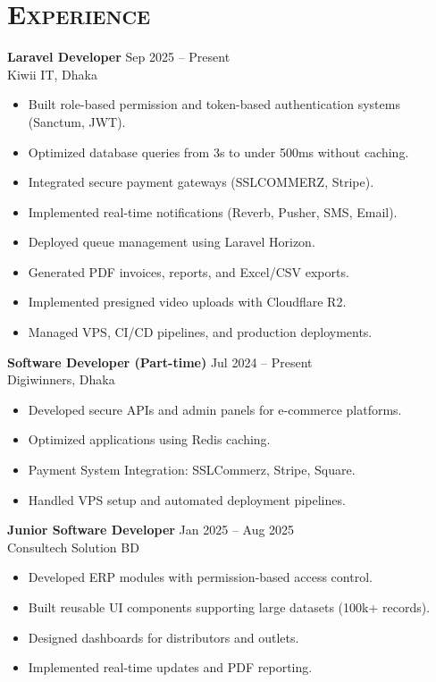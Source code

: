 \documentclass[11pt]{article}
\begin{document}
\section*{\scshape Experience}
\textbf{Laravel Developer} \hfill Sep 2025 -- Present\\
Kiwii IT, Dhaka
\begin{itemize}
	\item Built role-based permission and token-based authentication systems (Sanctum, JWT).
	\item Optimized database queries from 3s to under 500ms without caching.
	\item Integrated secure payment gateways (SSLCOMMERZ, Stripe).
	\item Implemented real-time notifications (Reverb, Pusher, SMS, Email).
	\item Deployed queue management using Laravel Horizon.
	\item Generated PDF invoices, reports, and Excel/CSV exports.
	\item Implemented presigned video uploads with Cloudflare R2.
	\item Managed VPS, CI/CD pipelines, and production deployments.
\end{itemize}
\vspace{8pt}

\textbf{Software Developer (Part-time)} \hfill Jul 2024 -- Present\\
Digiwinners, Dhaka
\begin{itemize}
	\item Developed secure APIs and admin panels for e-commerce platforms.
	\item Optimized applications using Redis caching.
	\item Payment System Integration: SSLCommerz, Stripe, Square.
	\item Handled VPS setup and automated deployment pipelines.
\end{itemize}
\vspace{8pt}

\textbf{Junior Software Developer} \hfill Jan 2025 -- Aug 2025\\
Consultech Solution BD
\begin{itemize}
	\item Developed ERP modules with permission-based access control.
	\item Built reusable UI components supporting large datasets (100k+ records).
	\item Designed dashboards for distributors and outlets.
	\item Implemented real-time updates and PDF reporting.
\end{itemize}
\vspace{10pt}
\end{document}
